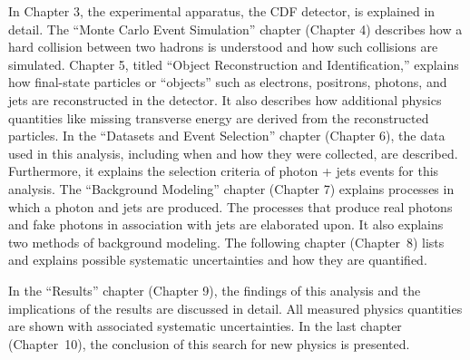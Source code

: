 In Chapter 3, the experimental apparatus, the CDF detector, is explained in detail. The ``Monte Carlo Event Simulation'' chapter (Chapter 4) describes how a hard collision between two hadrons is understood and how such collisions are simulated. Chapter 5, titled ``Object Reconstruction and Identification,'' explains how final-state particles or ``objects'' such as electrons, positrons, photons, and jets are reconstructed in the detector. It also describes how additional physics quantities like missing transverse energy are derived from the reconstructed particles. In the ``Datasets and Event Selection'' chapter (Chapter 6), the data used in this analysis, including when and how they were collected, are described. Furthermore, it explains the selection criteria of photon + jets events for this analysis. The ``Background Modeling'' chapter (Chapter 7) explains processes in which a photon and jets are produced. The processes that produce real photons and fake photons in association with jets are elaborated upon. It also explains two methods of background modeling. The following chapter (Chapter~8) lists and explains possible systematic uncertainties and how they are quantified.

In the ``Results'' chapter (Chapter 9), the findings of this analysis and the implications of the results are discussed in detail. All measured physics quantities are shown with associated systematic uncertainties. In the last chapter (Chapter~10), the conclusion of this search for new physics is presented.